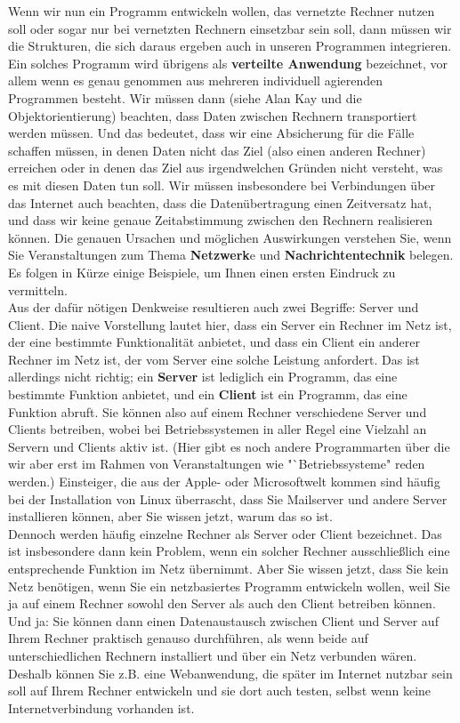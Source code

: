 Wenn wir nun ein Programm entwickeln wollen, das vernetzte Rechner nutzen soll oder sogar nur bei vernetzten Rechnern einsetzbar sein soll, dann müssen wir die Strukturen, die sich daraus ergeben auch in unseren Programmen integrieren. Ein solches Programm wird übrigens als \textbf{verteilte Anwendung} bezeichnet, vor allem wenn es genau genommen aus mehreren individuell agierenden Programmen besteht. Wir müssen dann (siehe Alan Kay und die Objektorientierung) beachten, dass Daten zwischen Rechnern transportiert werden müssen. Und das bedeutet, dass wir eine Absicherung für die Fälle schaffen müssen, in denen Daten nicht das Ziel (also einen anderen Rechner) erreichen oder in denen das Ziel aus irgendwelchen Gründen nicht versteht, was es mit diesen Daten tun soll. Wir müssen insbesondere bei Verbindungen über das Internet auch beachten, dass die Datenübertragung einen Zeitversatz hat, und dass wir keine genaue Zeitabstimmung zwischen den Rechnern realisieren können. Die genauen Ursachen und möglichen Auswirkungen verstehen Sie, wenn Sie Veranstaltungen zum Thema \textbf{Netzwerk}e und \textbf{Nachrichtentechnik} belegen. Es folgen in Kürze einige Beispiele, um Ihnen einen ersten Eindruck zu vermitteln.\\

Aus der dafür nötigen Denkweise resultieren auch zwei Begriffe: Server und Client. Die naive Vorstellung lautet hier, dass ein Server ein Rechner im Netz ist, der eine bestimmte Funktionalität anbietet, und dass ein Client ein anderer Rechner im Netz ist, der vom Server eine solche Leistung anfordert. Das ist allerdings nicht richtig; ein \textbf{Server} ist lediglich ein Programm, das eine bestimmte Funktion anbietet, und ein \textbf{Client} ist ein Programm, das eine Funktion abruft. Sie können also auf einem Rechner verschiedene Server und Clients betreiben, wobei bei Betriebssystemen in aller Regel eine Vielzahl an Servern und Clients aktiv ist. (Hier gibt es noch andere Programmarten über die wir aber erst im Rahmen von Veranstaltungen wie "`Betriebssysteme" reden werden.) Einsteiger, die aus der Apple- oder Microsoftwelt kommen sind häufig bei der Installation von Linux überrascht, dass Sie Mailserver und andere Server installieren können, aber Sie wissen jetzt, warum das so ist.\\

Dennoch werden häufig einzelne Rechner als Server oder Client bezeichnet. Das ist insbesondere dann kein Problem, wenn ein solcher Rechner ausschließlich eine entsprechende Funktion im Netz übernimmt. Aber Sie wissen jetzt, dass Sie kein Netz benötigen, wenn Sie ein netzbasiertes Programm entwickeln wollen, weil Sie ja auf einem Rechner sowohl den Server als auch den Client betreiben können. Und ja: Sie können dann einen Datenaustausch zwischen Client und Server auf Ihrem Rechner praktisch genauso durchführen, als wenn beide auf unterschiedlichen Rechnern installiert und über ein Netz verbunden wären. Deshalb können Sie z.B. eine Webanwendung, die später im Internet nutzbar sein soll auf Ihrem Rechner entwickeln und sie dort auch testen, selbst wenn keine Internetverbindung vorhanden ist.\\

